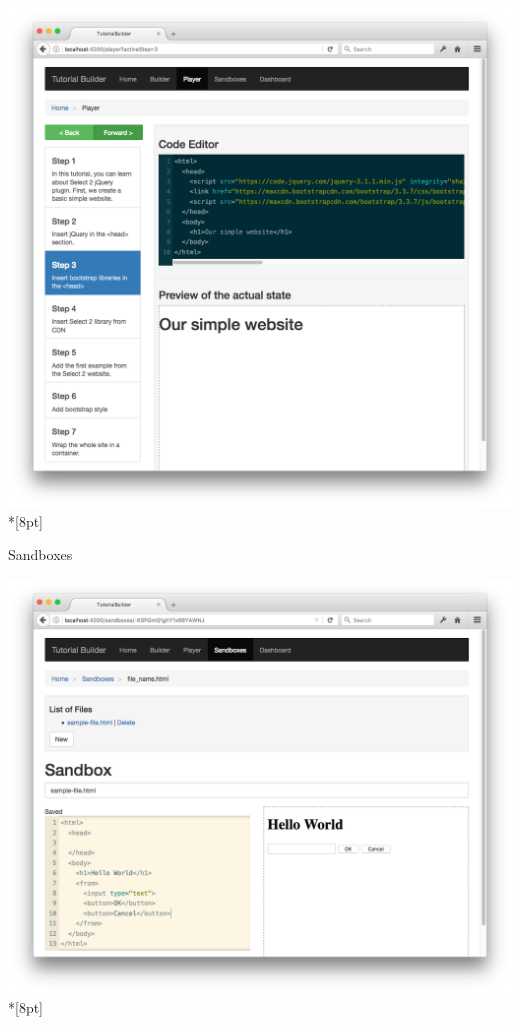 \documentclass[12pt, a4paper, oneside, openright, medskipamount]{report}
\begin{document}
\includegraphics[width=1\textwidth]{assets/tour-screenshots/the-player.png}\\*[8pt]

Sandboxes

\includegraphics[width=1\textwidth]{assets/tour-screenshots/the-sandbox.png}\\*[8pt]
\end{document}

